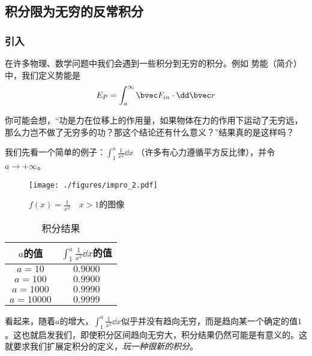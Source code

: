 \begin{issues}
\issueTODO
\issueDraft
\end{issues}

\subsection{积分限为无穷的反常积分}

\subsubsection{引入}
在许多物理、数学问题中我们会遇到一些积分到无穷的积分。例如 势能（简介） 中，我们定义势能是
$$E_P=\int ^\infty_a \bvec F_{in} \cdot \dd \bvec r$$

你可能会想，“功是力在位移上的作用量，如果物体在力的作用下运动了无穷远，那么力岂不做了无穷多的功？那这个结论还有什么意义？”结果真的是这样吗？

我们先看一个简单的例子：$\int^a_1 \frac{1}{x^2} \dd x$ （许多有心力遵循平方反比律），并令$a\to+\infty$。

\begin{figure}[ht]
\centering
\texttt{[image: ./figures/impro\_2.pdf]}
\caption{$f(x)=\frac{1}{x^2} \quad x>1$的图像} \label{impro_fig2}
\end{figure}

\begin{table}[ht]
\centering
\caption{积分结果}\label{impro_tab1}
\begin{tabular}{|c|c|}
\hline
$a$的值 & $\int^a_1 \frac{1}{x^2} \dd x$的值 \\
\hline
$a=10$ & $0.9000$ \\
\hline
$a=100$ & $0.9900$ \\
\hline
$a=1000$ & $0.9990$ \\
\hline
$a=10000$& $0.9999$\\
\hline
\end{tabular}
\end{table}
看起来，随着$a$的增大，$\int^a_1 \frac{1}{x^2} \dd x$似乎并没有趋向无穷，而是趋向某一个确定的值$1$。这也就启发我们，即使积分区间趋向无穷大，积分结果仍然可能是有意义的。这就要求我们扩展定积分的定义，\textsl{玩一种很新的积分}。

